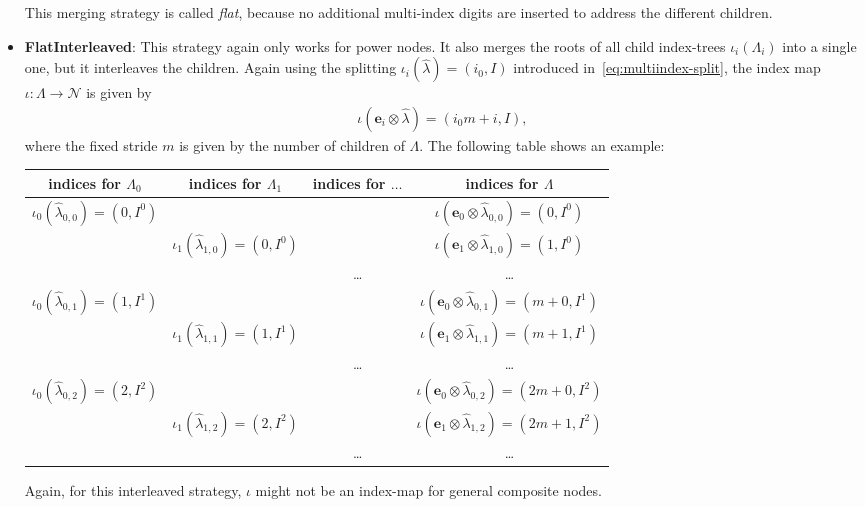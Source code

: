 \documentclass[a4paper,10pt,headings=normal,bibliography=totoc]{scrartcl}
\begin{document}
\begin{itemize}
    This merging strategy is called \emph{flat}, because no
    additional multi-index digits are inserted to address the different children.

  \item \textbf{FlatInterleaved}: This strategy again only works for power nodes.
    It also merges
    the roots of all child index-trees $\iota_i(\Lambda_i)$
    into a single one, but it interleaves the children.
    Again using the splitting
    $\iota_i(\hat{\lambda}) = (i_0,I)$ introduced in~\eqref{eq:multiindex-split},
    the index map $\iota:\Lambda \to \mathcal{N}$ is given by
    \begin{align*}
      \iota(\mathbf{e}_i \otimes\hat{\lambda}) = (i_0 m + i, I),
    \end{align*}
    where the fixed stride $m$ is given by the number of children of $\Lambda$.
    The following table shows an example:

    \begin{tabular}{c|c|c|c}
      indices for $\Lambda_0$ &
      indices for $\Lambda_1$ &
      indices for $\dots$ &
      indices for $\Lambda$ \\
      \hline
      $\iota_0(\hat{\lambda}_{0,0}) = (0,I^0)$ & & &
        $\iota(\mathbf{e}_0 \otimes \hat{\lambda}_{0,0}) = (0,I^0)$ \\
      & $\iota_1(\hat{\lambda}_{1,0}) = (0,I^0)$ & &
        $\iota(\mathbf{e}_1 \otimes \hat{\lambda}_{1,0}) = (1,I^0)$ \\
      & & \dots &
        \dots \\
      $\iota_0(\hat{\lambda}_{0,1}) = (1,I^1)$ & & &
        $\iota(\mathbf{e}_0 \otimes \hat{\lambda}_{0,1}) = (m+0,I^1)$ \\
      & $\iota_1(\hat{\lambda}_{1,1}) = (1,I^1)$ & &
        $\iota(\mathbf{e}_1 \otimes \hat{\lambda}_{1,1}) = (m+1,I^1)$ \\
      & & \dots &
        \dots \\
      $\iota_0(\hat{\lambda}_{0,2}) = (2,I^2)$ & & &
        $\iota(\mathbf{e}_0 \otimes \hat{\lambda}_{0,2}) = (2m+0,I^2)$ \\
      & $\iota_1(\hat{\lambda}_{1,2}) = (2,I^2)$ & &
        $\iota(\mathbf{e}_1 \otimes \hat{\lambda}_{1,2}) = (2m+1,I^2)$ \\
      & & \dots &
        \dots \\
    \end{tabular}

    Again, for this interleaved strategy, $\iota$ might not be an
    index-map for general composite nodes.
\end{itemize}
\end{document}
